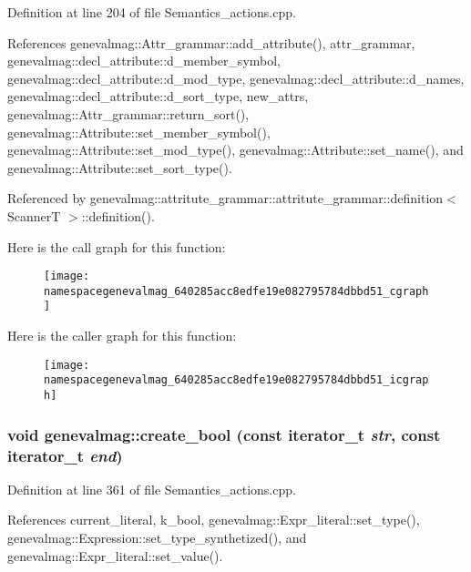 Definition at line 204 of file Semantics\_\-actions.cpp.

References genevalmag::Attr\_\-grammar::add\_\-attribute(), attr\_\-grammar, genevalmag::decl\_\-attribute::d\_\-member\_\-symbol, genevalmag::decl\_\-attribute::d\_\-mod\_\-type, genevalmag::decl\_\-attribute::d\_\-names, genevalmag::decl\_\-attribute::d\_\-sort\_\-type, new\_\-attrs, genevalmag::Attr\_\-grammar::return\_\-sort(), genevalmag::Attribute::set\_\-member\_\-symbol(), genevalmag::Attribute::set\_\-mod\_\-type(), genevalmag::Attribute::set\_\-name(), and genevalmag::Attribute::set\_\-sort\_\-type().

Referenced by genevalmag::attritute\_\-grammar::attritute\_\-grammar::definition$<$ ScannerT $>$::definition().

Here is the call graph for this function:\nopagebreak
\begin{figure}[H]
\begin{center}
\leavevmode
\texttt{[image: namespacegenevalmag\_640285acc8edfe19e082795784dbbd51\_cgraph]}
\end{center}
\end{figure}


Here is the caller graph for this function:\nopagebreak
\begin{figure}[H]
\begin{center}
\leavevmode
\texttt{[image: namespacegenevalmag\_640285acc8edfe19e082795784dbbd51\_icgraph]}
\end{center}
\end{figure}
\hypertarget{namespacegenevalmag_b6467a68d84550ca5d16d15c247499f4}{
\subsubsection[{create\_\-bool}]{\setlength{\rightskip}{0pt plus 5cm}void genevalmag::create\_\-bool (const iterator\_\-t {\em str}, \/  const iterator\_\-t {\em end})}}
\label{namespacegenevalmag_b6467a68d84550ca5d16d15c247499f4}




Definition at line 361 of file Semantics\_\-actions.cpp.

References current\_\-literal, k\_\-bool, genevalmag::Expr\_\-literal::set\_\-type(), genevalmag::Expression::set\_\-type\_\-synthetized(), and genevalmag::Expr\_\-literal::set\_\-value().

